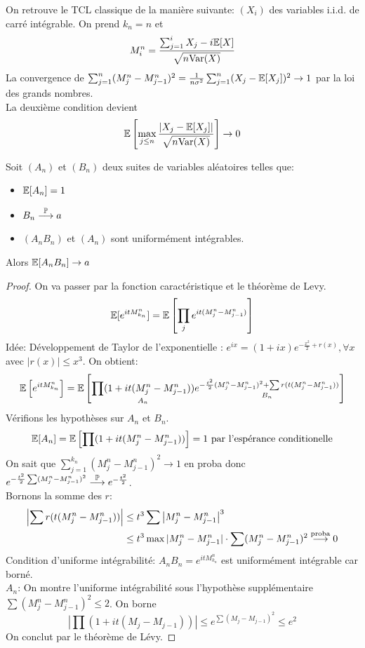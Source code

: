\documentclass[]{report}
\begin{document}
    \begin{re}{}{}
        On retrouve le TCL classique de la manière suivante: $(X_i)$ des variables i.i.d. de carré intégrable. On prend $k_n=n$ et
        \[M_i^n=\frac{\sum_{j=1}^{i}X_j-i\mathbb{E}[X]}{\sqrt{n\text{Var} (X)}}\]
        La convergence de $\sum_{j=1}^n(M^n_j-M^n_{j-1})^2=\frac{1}{n\sigma^2}\sum_{j=1}^n(X_j-\mathbb{E}[X_j])^2\to 1$ par la loi des grands nombres.\\
        La deuxième condition devient
        \[\mathbb{E}\left[\max_{j\le n}\frac{|X_j-\mathbb{E}[X_j]|}{\sqrt{n\text{Var}(X)}}\right]\to 0\]
    \end{re}

    \begin{lm}{}{}
        Soit $(A_n)$ et $(B_n)$ deux suites de variables aléatoires telles que:
        \begin{itemize}
            \item $\mathbb{E}[A_n]=1$
            \item $B_n\overset{\mathbb{P}}{\longrightarrow} a$
            \item $(A_n B_n)$ et $(A_n)$ sont uniformément intégrables.
        \end{itemize}
        Alors $\mathbb{E}[A_n B_n]\to a$
    \end{lm}

    \begin{proof}
        On va passer par la fonction caractéristique et le théorème de Levy.
        \[\mathbb{E}[e^{it M_{k_n}^n}]=\mathbb{E}\left[\prod_j e^{it(M_j^n-M_{j-1}^n)}\right]\]
        Idée: Développement de Taylor de l'exponentielle : $e^{ix}=(1+ix)e^{-\frac{x^2}{2}+r(x)},\forall x$ avec $|r(x)|\le x^3$. On obtient:
        \[\mathbb{E}\left[e^{itM_{k_n}^n}\right]=\mathbb{E}\left[\underset{A_n}{\prod (1+it(M_j^n-M_{j-1}^n))}\underset{B_n}{e^{-\frac{t^2}{2}(M_j^n-M_{j-1}^n)^2 +\sum r(t(M_j^n-M_{j-1}^n))}}\right]\]
        Vérifions les hypothèses sur $A_n$ et $B_n$.
        \[\mathbb{E}[A_n]=\mathbb{E}\left[\prod(1+it(M_j^n-M_{j-1}^n))\right]=1\text{ par l'espérance conditionelle}\]
        On sait que $\sum_{j=1}^{k_n}(M_j^n-M_{j-1}^n)^2\to 1$ en proba donc $e^{-\frac{t^2}{2}\sum(M_j^n-M_{j-1}^n)^2}\overset{\mathbb{P}}{\longrightarrow}e^{-\frac{t^2}{2}}$.\\
        Bornons la somme des $r$:
        \begin{align*}
            \left|\sum r(t(M_j^n-M_{j-1}^n))\right|&\le t^3\sum \left|M_j^n-M_{j-1}^n\right|^3\\
            &\le t^3\max|M_j^n-M_{j-1}^n| \cdot \sum(M_j^n-M_{j-1}^n)^2\overset{\text{proba}}{\longrightarrow} 0
        \end{align*}
        Condition d'uniforme intégrabilité:
        $A_n B_n=e^{itM_{k_n}^n}$ est uniformément intégrable car borné.\\
        $A_n$: On montre l'uniforme intégrabilité sous l'hypothèse supplémentaire $\sum(M_j^n-M_{j-1}^n)^2\le 2$. On borne
        \[\left|\prod(1+it(M_j-M_{j-1}))\right|\le e^{\sum (M_j-M_{j-1})^2}\le e^2\]
        On conclut par le théorème de Lévy.
    \end{proof}
\end{document}

